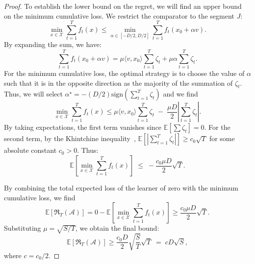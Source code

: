 \documentclass[journal,onecolumn]{IEEEtran}
\newcommand{\cA}{\mathcal{A}}
\newcommand{\cX}{\mathcal{X}}
\theoremstyle{plain}
\theoremstyle{definition}
\theoremstyle{remark}
\newcommand{\regret}{\mathfrak{R}}
\begin{document}
{\begin{proof}
To establish the lower bound on the regret, we will find an upper bound on the minimum cumulative loss. We restrict the comparator to the segment $J$:
\begin{equation*}
\min_{x \in \cX} \sum_{t=1}^T f_t(x)
\le\min_{\alpha \in [-D/2, D/2]} \sum_{t=1}^T f_t(x_0 + \alpha v).
\end{equation*}
By expanding the sum, we have:
\begin{equation*}
\sum_{t=1}^T f_t(x_0 + \alpha v)
=\mu \langle v, x_0 \rangle \sum_{t=1}^T \zeta_t + \mu \alpha \sum_{t=1}^T \zeta_t.
\end{equation*}
For the minimum cumulative loss, the optimal strategy is to choose the value of $\alpha$ such that it is in the opposite direction as the majority of the summation of $\zeta_t$. Thus, we will select $\alpha^\star = -(D/2)\mathrm{sign}(\sum_{t=1}^T \zeta_t)$ and we find
\begin{equation*}
\min_{x \in \cX} \sum_{t=1}^T f_t(x)
\le \mu \langle v, x_0 \rangle \sum_{t=1}^T \zeta_t \;-\; \frac{\mu D}{2} \left| \sum_{t=1}^T \zeta_t \right|.
\end{equation*}
By taking expectations, the first term vanishes since $\mathbb{E}[\sum \zeta_t] = 0$. For the second term, by the Khintchine inequality~\cite[Lemma A.9]{cesa2006prediction}, $\mathbb{E}[|\sum_{t=1}^T \zeta_t|] \ge c_0 \sqrt{T}$ for some absolute constant $c_0 > 0$. Thus:
\begin{equation*}
\mathbb{E}\left[ \min_{x \in \cX} \sum_{t=1}^T f_t(x) \right] \;\le\; - \frac{c_0 \mu D}{2} \sqrt{T}.
\end{equation*}

By combining the total expected loss of the learner of zero with the minimum cumulative loss, we find
\begin{equation*}
\mathbb{E}[\regret_T(\cA)]
= 0 - \mathbb{E}\left[ \min_{x \in \cX} \sum_{t=1}^T f_t(x) \right]
\ge \frac{c_0 \mu D}{2} \sqrt{T}.
\end{equation*}
Substituting $\mu = \sqrt{S/T}$, we obtain the final bound:
\begin{equation*}
\mathbb{E}[\regret_T(\cA)] \ge \frac{c_0 D}{2} \sqrt{\frac{S}{T}} \sqrt{T} \;=\; c D \sqrt{S},
\end{equation*}
where $c = c_0/2$.
\fi
\end{proof}

}
\end{document}

